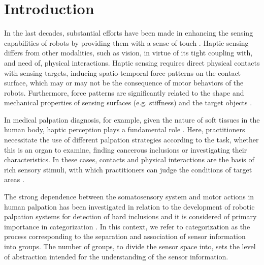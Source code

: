 \documentclass[]{interact}
\theoremstyle{plain}%
\theoremstyle{definition}
\theoremstyle{remark}
\begin{document}
\section{Introduction}
In the last decades, substantial efforts have been made in enhancing the sensing capabilities 
of robots by providing them with a sense of touch \cite{dahiya_tactile_2010, drimus2014design}. Haptic sensing differs from 
other modalities, such as vision, in virtue of its tight coupling with, and need of, physical interactions. 
Haptic sensing requires direct physical contacts with sensing targets, inducing spatio-temporal force patterns 
on the contact surface, which may or may not be the consequence of motor behaviors of the robots. 
Furthermore, force patterns are significantly related to the shape and mechanical properties of sensing 
surfaces (e.g. stiffness) and the target objects \cite{scimecasoft, fumiya_2016}. 

In medical palpation diagnosis, for example, given the nature of soft tissues in the human body, 
haptic perception plays a fundamental role \cite{puangmali2008state}. Here, practitioners necessitate the use of different palpation
strategies according to the task, whether this is an organ to examine, finding cancerous inclusions or 
investigating their characteristics. In these cases, contacts and physical interactions  are the basis of rich sensory 
stimuli, with which practitioners can judge the conditions of target areas \cite{palpation1,palpation2,palpation3}.

The strong dependence between the somatosensory system and motor actions in human palpation has been investigated 
in relation to the development of robotic palpation systems for detection of hard inclusions 
\cite{Liza2014,Liza2014behavioral,sornkarn2016efficacy, yen2003palpation, konstantinova2017palpation} and it is considered 
of primary importance in categorization \cite{pfeifer1997}. In this context, we refer to categorization as the process 
corresponding to the separation and association of sensor information into groups. 
The number of groups, to divide the sensor space into, sets the level of abstraction intended for the understanding 
of the sensor information. 
 
\end{document}
